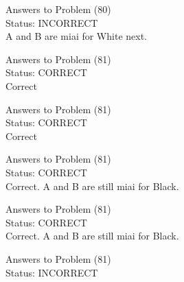 \documentclass[11pt]{article}
\begin{document}
\begin{minipage}[t]{0.5\textwidth}
  {\centering
  
  Answers to Problem (80)\\
  Status: INCORRECT\\
  A and B are miai for White next.\\
  }
\end{minipage}
\begin{minipage}[t]{0.5\textwidth}
  {\centering
  
  Answers to Problem (81)\\
  Status: CORRECT\\
  Correct\\
  }
\end{minipage}
\begin{minipage}[t]{0.5\textwidth}
  {\centering
  
  Answers to Problem (81)\\
  Status: CORRECT\\
  Correct\\
  }
\end{minipage}
\begin{minipage}[t]{0.5\textwidth}
  {\centering
  
  Answers to Problem (81)\\
  Status: CORRECT\\
  Correct. A and B are still miai for Black.\\
  }
\end{minipage}
\begin{minipage}[t]{0.5\textwidth}
  {\centering
  
  Answers to Problem (81)\\
  Status: CORRECT\\
  Correct. A and B are still miai for Black.\\
  }
\end{minipage}
\begin{minipage}[t]{0.5\textwidth}
  {\centering
  
  Answers to Problem (81)\\
  Status: INCORRECT\\
  
  }
\end{minipage}
\end{document}
